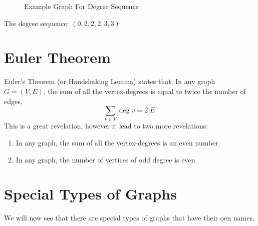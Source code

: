 \begin{minipage}{0.5\textwidth}
    \begin{figure}[H]
        \centering
        \caption{Example Graph For Degree Sequence}
    \end{figure}
\end{minipage} \hfill
\begin{minipage}{0.45\textwidth}
The degree sequence: $(0, 2, 2, 2, 3, 3)$
\end{minipage}

\section{Euler Theorem}
Euler's Theorem (or Handshaking Lemma) states that: In any graph $G = (V,E)$, the sum of all the vertex-degrees is equal to twice the number of edges,
\[\sum_{v \in V} \deg v = 2|E|\]
This is a great revelation, however it lead to two more revelations:
\begin{enumerate}
    \item In any graph, the sum of all the vertex-degrees is an even number
    \item In any graph, the number of vertices of odd degree is even
\end{enumerate}

\section{Special Types of Graphs}
We will now see that there are special types of graphs that have their oen names.
